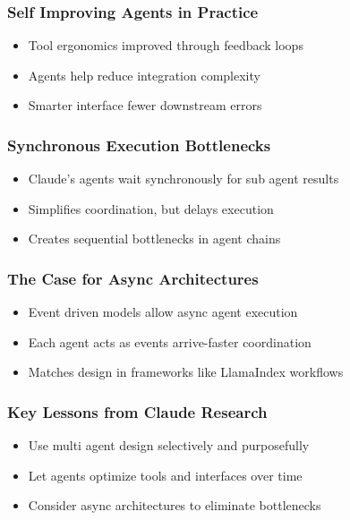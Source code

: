 \begin{frame}[fragile]\frametitle{Self Improving Agents in Practice}
    \begin{itemize}
        \item Tool ergonomics improved through feedback loops
        \item Agents help reduce integration complexity
        \item Smarter interface   fewer downstream errors
    \end{itemize}
\end{frame}

\begin{frame}[fragile]\frametitle{Synchronous Execution   Bottlenecks}
    \begin{itemize}
        \item Claude's agents wait synchronously for sub agent results
        \item Simplifies coordination, but delays execution
        \item Creates sequential bottlenecks in agent chains
    \end{itemize}
\end{frame}

\begin{frame}[fragile]\frametitle{The Case for Async Architectures}
    \begin{itemize}
        \item Event driven models allow async agent execution
        \item Each agent acts as events arrive-faster coordination
        \item Matches design in frameworks like LlamaIndex workflows
    \end{itemize}
\end{frame}

\begin{frame}[fragile]\frametitle{Key Lessons from Claude Research}
    \begin{itemize}
        \item Use multi agent design selectively and purposefully
        \item Let agents optimize tools and interfaces over time
        \item Consider async architectures to eliminate bottlenecks
    \end{itemize}
\end{frame}
